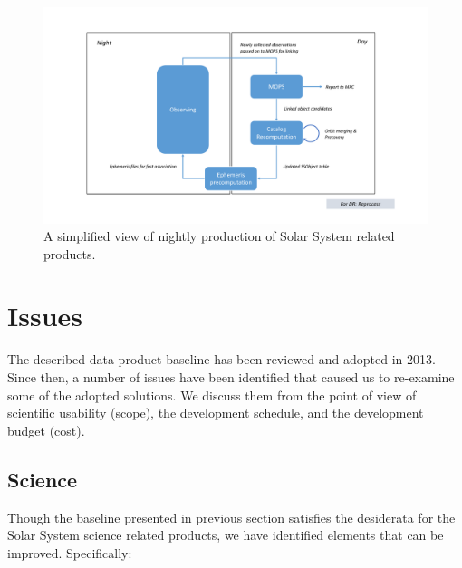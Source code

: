 \documentclass[DM,authoryear,toc]{lsstdoc}
\begin{document}
\begin{figure}
	\caption{A simplified view of nightly production of Solar System related products.\label{fig:productionNow}}
	\centering
	\includegraphics[page=1,width=1.0\textwidth]{figures/processing.pdf}
\end{figure}

\section{Issues}

The described data product baseline has been reviewed and adopted in 2013. Since then, a number of issues have been identified that caused us to re-examine some of the adopted solutions. We discuss them from the point of view of scientific usability (scope), the development schedule, and the development budget (cost).

\subsection{Science}

Though the baseline presented in previous section satisfies the desiderata for the Solar System science related products, we have identified elements that can be improved. Specifically:
\end{document}
